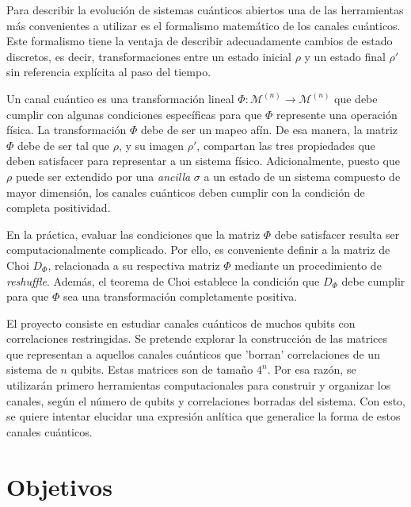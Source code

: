 \documentclass[11pt, spanish, letterpage]{article}
\begin{document}
Para describir la evolución de sistemas cuánticos abiertos una de las herramientas más convenientes a utilizar es el formalismo matemático de los canales cuánticos. Este formalismo tiene la ventaja de describir adecuadamente cambios de estado discretos, es decir, transformaciones entre un estado inicial $\rho$ y un estado final $\rho '$ sin referencia explícita al paso del tiempo. 

Un canal cuántico es una transformación lineal $\Phi : \mathcal{M}^{(n)} \to \mathcal{M}^{(n)}$ que debe cumplir con algunas condiciones específicas para que $\Phi$ represente una operación física. La transformación $\Phi$ debe de ser un mapeo afín. De esa manera, la matriz $\Phi$ debe de ser tal que $\rho$, y su imagen $\rho '$, compartan las tres propiedades que deben satisfacer para representar a un sistema físico. Adicionalmente, puesto que $\rho$ puede ser extendido por una \textit{ancilla} $\sigma$ a un estado de un sistema compuesto de mayor dimensión, los canales cuánticos deben cumplir con la condición de completa positividad. 

En la práctica, evaluar las condiciones que la matriz $\Phi$ debe satisfacer resulta ser computacionalmente complicado. Por ello, es conveniente definir a la matriz de Choi $D_{\Phi}$, relacionada a su respectiva matriz $\Phi$ mediante un procedimiento de \textit{reshuffle}. Además, el teorema de Choi establece la condición que $D_{\Phi}$ debe cumplir para que $\Phi$ sea una transformación completamente positiva. 

El proyecto consiste en estudiar canales cuánticos de muchos qubits con correlaciones restringidas. Se pretende explorar la construcción de las matrices que representan a aquellos canales cuánticos que 'borran' correlaciones de un sistema de $n$ qubits. Estas matrices son de tamaño $4^n$. Por esa razón, se utilizarán primero herramientas computacionales para construir y organizar los canales, según el número de qubits y correlaciones borradas del sistema. Con esto, se quiere intentar elucidar una expresión anlítica que generalice la forma de estos canales cuánticos.  


\section{Objetivos}
\end{document}
